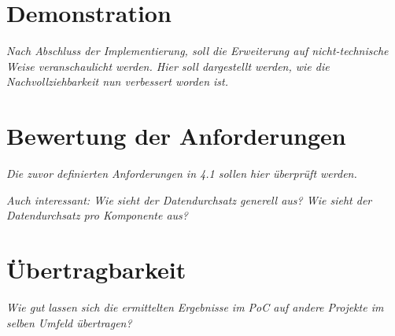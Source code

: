 
\section{Demonstration}
\label{sec:demonstration}

	\textit{Nach Abschluss der Implementierung, soll die Erweiterung auf nicht-technische Weise veranschaulicht werden. Hier soll dargestellt werden, wie die Nachvollziehbarkeit nun verbessert worden ist.}
	
\section{Bewertung der Anforderungen}

	\textit{Die zuvor definierten Anforderungen in 4.1 sollen hier überprüft werden.}

	\textit{Auch interessant: Wie sieht der Datendurchsatz generell aus? Wie sieht der Datendurchsatz pro Komponente aus?}
	

	
\section{Übertragbarkeit}
\label{sec:uebertragbarkeit}

	\textit{Wie gut lassen sich die ermittelten Ergebnisse im PoC auf andere Projekte im selben Umfeld übertragen?}